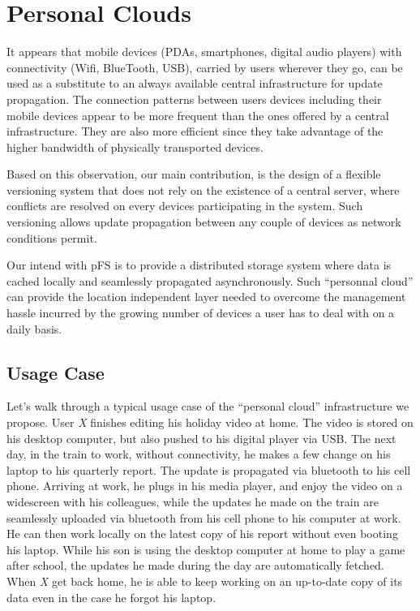 


\section{Personal Clouds}
\label{sec:model}


It appears that mobile devices (PDAs, smartphones, digital audio
players) with connectivity (Wifi, BlueTooth, USB), carried by users
wherever they go, can be used as a substitute to an always available
central infrastructure for update propagation. The connection patterns
between users devices including their mobile devices appear to be more
frequent than the ones offered by a central infrastructure. They are
also more efficient since they take advantage of the higher bandwidth
of physically transported devices.

Based on this observation, our main contribution, is the design of a
flexible versioning system that does not rely on the existence of a
central server, where conflicts are resolved on every devices
participating in the system. Such versioning allows update propagation
between any couple of devices as network conditions permit.

Our intend with pFS is to provide a distributed storage system where
data is cached locally and seamlessly propagated asynchronously. Such
``personnal cloud'' can provide the location independent layer needed
to overcome the management hassle incurred by the growing number of
devices a user has to deal with on a daily basis.

\subsection{Usage Case}

Let's walk through a typical usage case of the ``personal cloud''
infrastructure we propose. User \emph{X} finishes editing his holiday
video at home. The video is stored on his desktop computer, but also
pushed to his digital player via USB. The next day, in the train to
work, without connectivity, he makes a few change on his laptop to his
quarterly report. The update is propagated via bluetooth to his cell
phone. Arriving at work, he plugs in his media player, and enjoy the
video on a widescreen with his colleagues, while the updates
he made on the train are seamlessly uploaded via bluetooth from his
cell phone to his computer at work. He can then work locally on the
latest copy of his report without even booting his laptop. While
his son is using the desktop computer at home to play a game after
school, the updates he made during the day are automatically
fetched. When \emph{X} get back home, he is able to keep working on an
up-to-date copy of its data even in the case he forgot his laptop.

